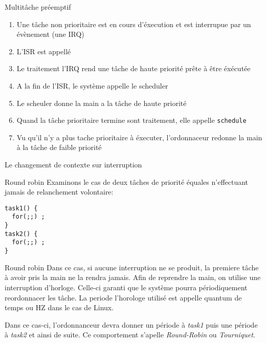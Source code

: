 \begin{frame}{Multitâche préemptif}
  \begin{enumerate} 
  \item  Une tâche  non prioritaire  est en  cours d'éxecution  et est
    interrupue par un évènement (une IRQ)
  \item L'ISR est appellé
  \item Le traitement  l'IRQ rend une tâche de  haute priorité prête à
    être éxécutée
  \item A la fin de l'ISR, le système appelle le scheduler
  \item Le scheuler donne la main a la tâche de haute priorité
  \item  Quand  la tâche  prioritaire  termine  sont traitement,  elle
    appelle \texttt{schedule}
  \item   Vu  qu'il  n'y   a  plus   tache  prioritaire   à  éxecuter,
    l'ordonnaceur redonne la main à la tâche de faible priorité
  \end{enumerate} 
\end{frame} 

\begin{frame}{Le changement de contexte sur interruption}
  \begin{center}
  \end{center}
\end{frame} 

\begin{frame}[fragile]{Round robin}
  Examinons  le cas de  deux tâches  de priorité  équales n'effectuant
  jamais de relanchement volontaire:
  \begin{lstlisting} 
task1() {
  for(;;) ;
}
task2() {
  for(;;) ;
}
  \end{lstlisting} 
\end{frame} 

\begin{frame}[fragile]{Round robin}
  Dans ce cas, si aucune interruption ne se produit, la premiere tâche
  à avoir pris la main ne la rendra jamais. Afin de reprendre la main,
  on  utilise une  interruption  d'horloge.  Celle-ci  garanti que  le
  système  pourra périodiquement  reordonnacer les  tâche.  La periode
  l'horologe utilisé est appelle quantum de temps ou HZ dans le cas de
  Linux.

  Dans   ce  cas-ci,   l'ordonnanceur  devra   donner  un   période  à
  \emph{task1} puis une période à  \emph{task2} et ainsi de suite.  Ce
  comportement s'apelle \emph{Round-Robin} ou \emph{Tourniquet}.
  \begin{center}
    
  \end{center}
\end{frame}

